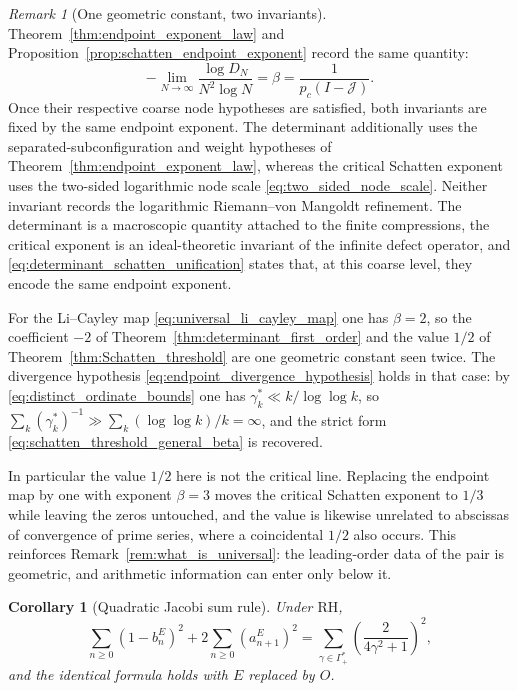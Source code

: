 \documentclass[11pt]{amsart}
\numberwithin{equation}{section}
\theoremstyle{plain}
\newtheorem{corollary}[theorem]{Corollary}
\theoremstyle{definition}
\theoremstyle{remark}
\newtheorem{remark}[theorem]{Remark}
\newcommand{\RH}{\mathrm{RH}}
\begin{document}
\begin{remark}[One geometric constant, two invariants]
\label{rem:beta_two_invariants}
Theorem~\ref{thm:endpoint_exponent_law} and Proposition~\ref{prop:schatten_endpoint_exponent} record the same quantity:
\begin{equation}
-\lim_{N\to\infty}\frac{\log D_N}{N^2\log N}
=\beta
=\frac{1}{p_c(I-\mathcal J)}.
\label{eq:determinant_schatten_unification}
\end{equation}
Once their respective coarse node hypotheses are satisfied, both invariants are fixed by the same endpoint exponent.  The determinant additionally uses the separated-subconfiguration and weight hypotheses of Theorem~\ref{thm:endpoint_exponent_law}, whereas the critical Schatten exponent uses the two-sided logarithmic node scale \eqref{eq:two_sided_node_scale}.  Neither invariant records the logarithmic Riemann--von Mangoldt refinement.  The determinant is a macroscopic quantity attached to the finite compressions, the critical exponent is an ideal-theoretic invariant of the infinite defect operator, and \eqref{eq:determinant_schatten_unification} states that, at this coarse level, they encode the same endpoint exponent.

For the Li--Cayley map \eqref{eq:universal_li_cayley_map} one has $\beta=2$, so the coefficient $-2$ of Theorem~\ref{thm:determinant_first_order} and the value $1/2$ of Theorem~\ref{thm:Schatten_threshold} are one geometric constant seen twice. The divergence hypothesis \eqref{eq:endpoint_divergence_hypothesis} holds in that case: by \eqref{eq:distinct_ordinate_bounds} one has $\gamma_k^*\ll k/\log\log k$, so $\sum_k(\gamma_k^*)^{-1}\gg\sum_k(\log\log k)/k=\infty$, and the strict form \eqref{eq:schatten_threshold_general_beta} is recovered.

In particular the value $1/2$ here is not the critical line. Replacing the endpoint map by one with exponent $\beta=3$ moves the critical Schatten exponent to $1/3$ while leaving the zeros untouched, and the value is likewise unrelated to abscissas of convergence of prime series, where a coincidental $1/2$ also occurs. This reinforces Remark~\ref{rem:what_is_universal}: the leading-order data of the pair is geometric, and arithmetic information can enter only below it.
\end{remark}

\begin{corollary}[Quadratic Jacobi sum rule]
\label{cor:quadratic_jacobi_sum_rule}
Under $\RH$,
\begin{equation}
\sum_{n\ge0}(1-b_n^E)^2+2\sum_{n\ge0}(a_{n+1}^E)^2
=
\sum_{\gamma\in\Gamma_+^*}\left(\frac{2}{4\gamma^2+1}\right)^2,
\label{eq:E_quadratic_sum_rule}
\end{equation}
and the identical formula holds with $E$ replaced by $O$.
\end{corollary}
\end{document}
